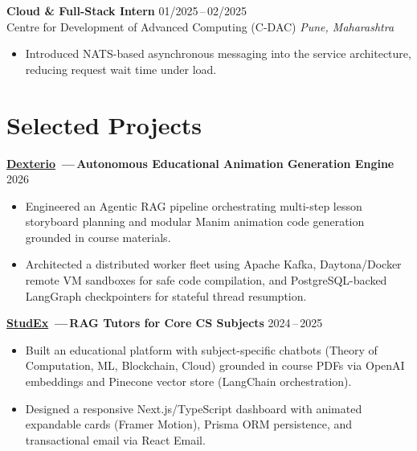 \documentclass[11pt,a4paper]{article}
\begin{document}
\vspace{0.4em}

\textbf{Cloud \& Full-Stack Intern} \hfill 01/2025\,--\,02/2025\\
Centre for Development of Advanced Computing (C-DAC) \hfill \textit{Pune, Maharashtra}
\begin{itemize}
  \item Introduced NATS-based asynchronous messaging into the service
        architecture, reducing request wait time under load.
\end{itemize}


\newpage


\section{Selected Projects}

\textbf{\href{https://github.com/jayraj-kl/dexterio}{Dexterio}%
\,---\,Autonomous Educational Animation Generation Engine}
\hfill 2026
\begin{itemize}
  \item Engineered an Agentic RAG pipeline orchestrating multi-step lesson storyboard planning and modular Manim animation code generation grounded in course materials.
  \item Architected a distributed worker fleet using Apache Kafka, Daytona/Docker remote VM sandboxes for safe code compilation, and PostgreSQL-backed LangGraph checkpointers for stateful thread resumption.
\end{itemize}

\vspace{0.35em}

\textbf{\href{https://github.com/jayraj-kl/stud-ex}{StudEx}%
\,---\,RAG Tutors for Core CS Subjects}
\hfill 2024\,--\,2025
\begin{itemize}
  \item Built an educational platform with subject-specific chatbots (Theory of Computation, ML, Blockchain, Cloud) grounded in course PDFs via OpenAI embeddings and Pinecone vector store (LangChain orchestration).
  \item Designed a responsive Next.js/TypeScript dashboard with animated expandable cards (Framer Motion), Prisma ORM persistence, and transactional email via React Email.
\end{itemize}
\end{document}
